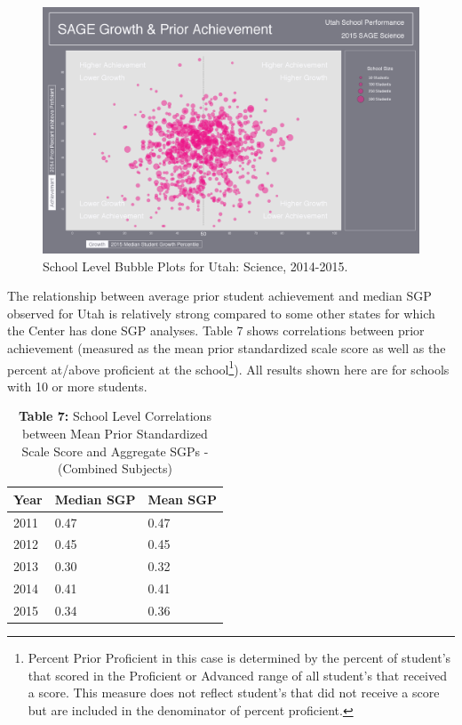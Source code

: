 \documentclass[12pt]{article}
\begin{document}
\begin{figure}[htbp]
\centering
\includegraphics{../img/Bubble_Plots/2015/State/Style_1/Utah_2015_Science_State_Bubble_Plot_(Prior_Achievement).png}
\caption{School Level Bubble Plots for Utah: Science, 2014-2015.}
\end{figure}

The relationship between average prior student achievement and median
SGP observed for Utah is relatively strong compared to some other states
for which the Center has done SGP analyses. Table 7 shows correlations
between prior achievement (measured as the mean prior standardized scale
score as well as the percent at/above proficient at the school\footnote{Percent
  Prior Proficient in this case is determined by the percent of
  student's that scored in the Proficient or Advanced range of all
  student's that received a score. This measure does not reflect
  student's that did not receive a score but are included in the
  denominator of percent proficient.}). All results shown here are for
schools with 10 or more students.

\begin{table}[H]
\caption*{\textbf{Table 7:} School Level Correlations between Mean Prior Standardized Scale Score and Aggregate SGPs - (Combined Subjects)\label{table7}} 
\begin{center}
\begin{tabular}{lll}
\hline\hline
\multicolumn{1}{c}{Year}&\multicolumn{1}{c}{Median SGP}&\multicolumn{1}{c}{Mean SGP}\tabularnewline
\hline
2011&0.47&0.47\tabularnewline
2012&0.45&0.45\tabularnewline
2013&0.30&0.32\tabularnewline
2014&0.41&0.41\tabularnewline
2015&0.34&0.36\tabularnewline
\hline
\end{tabular}\end{center}

\end{table}
\end{document}
